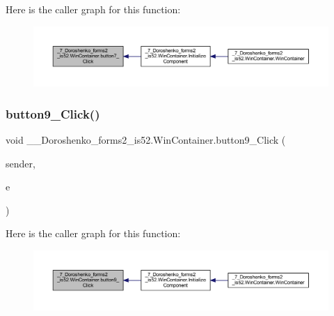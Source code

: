 Here is the caller graph for this function\+:
\nopagebreak
\begin{figure}[H]
\begin{center}
\leavevmode
\includegraphics[width=350pt]{class__7___doroshenko__forms2__is52_1_1_win_container_ab6d9121748802b45866dd3365e50015c_icgraph}
\end{center}
\end{figure}
\hypertarget{class__7___doroshenko__forms2__is52_1_1_win_container_af5d7e2bcc6b12621d1bcc172c269cea7}{}\label{class__7___doroshenko__forms2__is52_1_1_win_container_af5d7e2bcc6b12621d1bcc172c269cea7} 
\subsubsection{\texorpdfstring{button9\+\_\+\+Click()}{button9\_Click()}}
{\footnotesize\ttfamily void \+\_\+\_\+\+Doroshenko\+\_\+forms2\+\_\+is52.\+Win\+Container.\+button9\+\_\+\+Click (\begin{DoxyParamCaption}\item[{object}]{sender,  }\item[{Event\+Args}]{e }\end{DoxyParamCaption})\hspace{0.3cm}{\ttfamily [private]}}

Here is the caller graph for this function\+:
\nopagebreak
\begin{figure}[H]
\begin{center}
\leavevmode
\includegraphics[width=350pt]{class__7___doroshenko__forms2__is52_1_1_win_container_af5d7e2bcc6b12621d1bcc172c269cea7_icgraph}
\end{center}
\end{figure}
\hypertarget{class__7___doroshenko__forms2__is52_1_1_win_container_a050548a3d83799d8ff193dcbc42ca59f}{}\label{class__7___doroshenko__forms2__is52_1_1_win_container_a050548a3d83799d8ff193dcbc42ca59f} 
